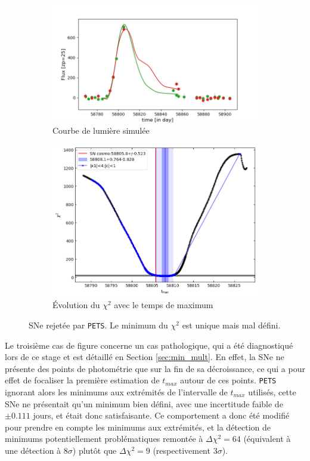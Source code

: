 \documentclass{book}
\def\pets{\texttt{PETS}\xspace}
\begin{document}
\begin{figure}[h]
	\begin{subfigure}{0.45\textwidth}
		\centering
		\includegraphics[width=\textwidth]{figures/10_lc_truth.png}
		\caption{Courbe de lumière simulée}
	\end{subfigure}
	\hfill
	\begin{subfigure}{0.45\textwidth}
		\centering
		\includegraphics[width=\textwidth]{figures/10_Tmaxgrid.png}
		\caption{Évolution du $\chi^2$ avec le temps de maximum}
	\end{subfigure}
	\caption{SNe rejetée par \pets. Le minimum du $\chi^2$ est unique mais mal défini.}
	\label{fig:pets_bad}
\end{figure}

Le troisième cas de figure concerne un cas pathologique, qui a été diagnostiqué lors de ce stage et est détaillé en Section \ref{sec:min_mult}. En effet, la SNe ne présente des points de photométrie que sur la fin de sa décroissance, ce qui a pour effet de focaliser la première estimation de $t_{max}$ autour de ces points. \pets ignorant alors les minimums aux extrémités de l'intervalle de $t_{max}$ utilisés, cette SNe ne présentait qu'un minimum bien défini, avec une incertitude faible de $\pm 0.111$ jours, et était donc satisfaisante. Ce comportement a donc été modifié pour prendre en compte les minimums aux extrémités, et la détection de minimums potentiellement problématiques remontée à $\Delta \chi^2 = 64$ (équivalent à une détection à $8\sigma$) plutôt que $\Delta \chi^2 = 9$ (respectivement $3\sigma$).
\end{document}
